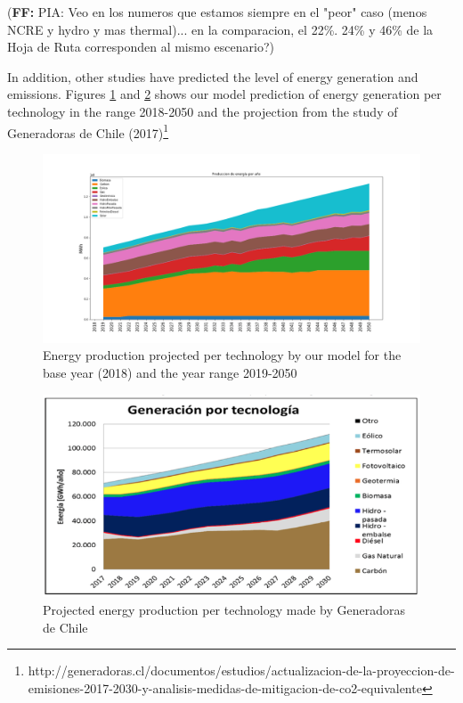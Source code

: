 \documentclass[11pt, letterpaper]{article}
\newcommand{\fel}[1]{{\color{red}({\bf FF:}#1)}}
\begin{document}
\fel{ PIA: Veo en los numeros que estamos siempre en el "peor" caso (menos NCRE y hydro y mas thermal)... en la comparacion, el 22\%. 24\% y 46\% de la Hoja de Ruta corresponden al mismo escenario?} 

In addition, other studies have predicted the level of energy generation and emissions. Figures \ref{fig:modelbau} and \ref{fig:gener} shows our model prediction of energy generation per technology in the range 2018-2050 and the projection from the study of Generadoras de Chile (2017)\footnote{http://generadoras.cl/documentos/estudios/actualizacion-de-la-proyeccion-de-emisiones-2017-2030-y-analisis-medidas-de-mitigacion-de-co2-equivalente}

\begin{figure}[ht!]
\begin{center}
\includegraphics[width=\textwidth]{Apuntes/Figures/produccion_per_year_sin_cnt.png}
\caption{Energy production projected per technology by our model for the base year (2018) and the year range 2019-2050} \label{fig:modelbau}   
\end{center}
\end{figure}

\begin{figure}[ht!]
\begin{center}
\includegraphics[width=13cm]{Apuntes/Figures/generadoras.png}
\caption{Projected energy production per technology made by Generadoras de Chile}
\label{fig:gener}
\end{center}
\end{figure}
\end{document}
